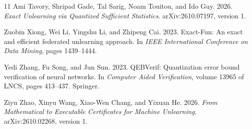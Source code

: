 \documentclass[11pt,a4paper]{article}
\def\href#1#2{{#2}}
\begin{document}
\begin{thebibliography}{11}
Ami Tavory, Shripad Gade, Tal Sarig, Noam Touitou, and Ido Guy.
2026. \emph{Exact Unlearning via Quantized Sufficient Statistics}.
\href{https://arxiv.org/html/2610.07197v1}{arXiv:2610.07197, version 1}.

Zuobin Xiong, Wei Li, Yingshu Li, and Zhipeng Cai. 2023.
\href{https://doi.org/10.1109/ICDM58522.2023.00188}{Exact-Fun: An exact and efficient federated unlearning approach}.
In \emph{IEEE International Conference on Data Mining}, pages 1439--1444.

Yedi Zhang, Fu Song, and Jun Sun. 2023.
\href{https://doi.org/10.1007/978-3-031-37703-7_20}{QEBVerif: Quantization error bound verification of neural networks}.
In \emph{Computer Aided Verification}, volume 13965 of LNCS, pages 413--437. Springer.

Ziyu Zhao, Xinyu Wang, Xiao-Wen Chang, and Yixuan He.
2026. \emph{From Mathematical to Executable Certificates for Machine Unlearning}.
\href{https://arxiv.org/html/2610.02268v1}{arXiv:2610.02268, version 1}.
\end{thebibliography}
\end{document}
